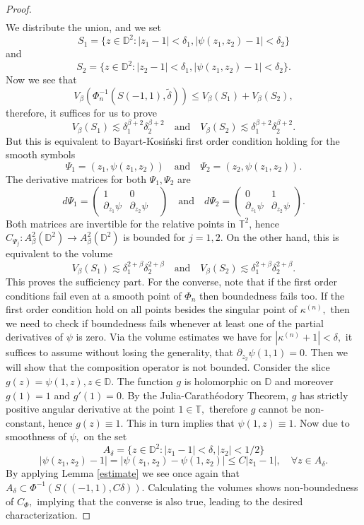 \documentclass[12pt]{amsart}
\numberwithin{equation}{section}
\begin{document}
\begin{proof}
\begin{multline}
\end{multline}
We distribute the union, and we set
$$S_1=\{z\in\mathbb{D}^2:|z_1-1|<\delta_1,|\psi(z_1,z_2)-1|<\delta_2\}$$
and $$S_2=\{z\in\mathbb{D}^2:|z_2-1|<\delta_1,|\psi(z_1,z_2)-1|<\delta_2\}.$$
Now we see that 
$$V_{\beta}(\Phi^{-1}_n(S(-1,1),\tilde{\delta}))\leq V_{\beta}(S_1)+V_{\beta}(S_2),$$
therefore, it suffices for us to prove 
$$V_{\beta}(S_1)\lesssim\delta_1^{\beta+2}\delta_2^{\beta+2} \quad \mathrm{and}\quad V_{\beta}(S_2)\lesssim\delta_1^{\beta+2}\delta_2^{\beta+2}. $$
But this is equivalent to Bayart-Kosi\'nski first order condition holding for the smooth symbols $$\Psi_1=(z_1,\psi(z_1,z_2))\quad \mathrm{and}\quad \Psi_2=(z_2,\psi(z_1,z_2)).$$
The derivative matrices for both $\Psi_1,\Psi_2$ are
$$d\Psi_1=\begin{pmatrix}
1 & 0 \\
\partial_{z_1}\psi & \partial_{z_2}\psi&  
\end{pmatrix}
\quad \mathrm{and} \quad d\Psi_2=\begin{pmatrix}
0 & 1 \\
\partial_{z_1}\psi &\partial_{z_2}\psi  
\end{pmatrix}.
$$
Both matrices are invertible for the relative points in $\mathbb{T}^2$, hence $C_{\Psi_{j}}:A^2_{\beta}(\mathbb{D}^2)\to A^2_{\beta}(\mathbb{D}^2)$ is bounded for $j=1,2.$ On the other hand, this is equivalent to the volume $$V_{\beta}(S_1)\lesssim\delta_1^{2+\beta}\delta_2^{2+\beta} \quad \mathrm{and} \quad V_{\beta}(S_2)\lesssim\delta_1^{2+\beta}\delta_2^{2+\beta}.$$
This proves the sufficiency part.
For the converse, note that if the first order conditions fail even at a smooth point of $\Phi_n$ then boundedness fails too. If the first order condition hold on all points besides the singular point of $\kappa^{(n)},$ then we need to check if boundedness fails whenever at least one of the partial derivatives of $\psi$ is zero. Via the volume estimates we have for $|\kappa^{(n)}+1|<\delta,$ it suffices to assume without losing the generality, that $\partial_{z_2}\psi(1,1)=0.$ Then we will show that the composition operator is not bounded. Consider the slice $g(z)=\psi(1,z),z\in \mathbb{D}.$ The function $g$ is holomorphic on $\mathbb{D}$ and moreover $g(1)=1$ and $g'(1)=0.$ By the Julia-Carath\'eodory Theorem, $g$ has strictly positive angular derivative at the point $1\in\mathbb{T},$ therefore $g$ cannot be non-constant, hence $g(z) \equiv1.$ This in turn implies that $\psi(1,z)\equiv 1.$ Now due to smoothness of $\psi,$ on the set $$A_{\delta}=\{z\in \mathbb{D}^2:|z_1-1|<\delta,|z_2|<1/2\}$$
$$|\psi(z_1,z_2)-1|=|\psi(z_1,z_2)-\psi(1,z_2)|\leq C|z_1-1|,\quad \forall z\in A_{\delta}.$$
By applying Lemma \ref{estimate} we see once again that $A_{\delta}\subset\Phi^{-1}(S((-1,1),C\delta)).$ Calculating the volumes shows non-boundedness of $C_{\Phi},$ implying that the converse is also true, leading to the desired characterization.
\end{proof}
\end{document}
